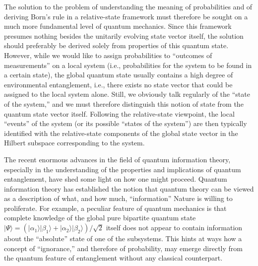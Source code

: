 \documentclass[twocolumn,aps,floatfix,amsmath,amssymb,showpacs,nofootinbib]{revtex4}
\newcommand{\ket}[1]{\ensuremath{|{#1\rangle}}}
\begin{document}
The solution to the problem of understanding the meaning of
probabilities and of deriving Born's rule in a relative-state
framework must therefore be sought on a much more fundamental level of
quantum mechanics. Since this framework presumes nothing besides the
unitarily evolving state vector itself, the solution should preferably
be derived solely from properties of this quantum state. However,
while we would like to assign probabilities to ``outcomes of
measurements'' on a local system (i.e., probabilities for the system
to be found in a certain state), the global quantum state usually
contains a high degree of environmental entanglement, i.e., there
exists no state vector that could be assigned to the local system
alone.  Still, we obviously talk regularly of the ``state of the
system,'' and we must therefore distinguish this notion of state from
the quantum state vector itself. Following the relative-state
viewpoint, the local ``events'' of the system (or its possible
``states of the system'') are then typically identified with the
relative-state components of the global state vector in the Hilbert
subspace corresponding to the system.

The recent enormous advances in the field of quantum information
theory, especially in the understanding of the properties and
implications of quantum entanglement, have shed some light on how one
might proceed. Quantum information theory has established the notion
that quantum theory can be viewed as a description of what, and how
much, ``information'' Nature is willing to proliferate. For example, a
peculiar feature of quantum mechanics is that complete knowledge of
the global pure bipartite quantum state $\ket{\Psi} = \left(
  \ket{\alpha_1}\ket{\beta_1} + \ket{\alpha_2}\ket{\beta_2}\right)
/\sqrt{2}$ itself does not appear to contain information about the
``absolute'' state of one of the subsystems.  This hints at ways how a
concept of ``ignorance,'' and therefore of probability, may emerge
directly from the quantum feature of entanglement without any
classical counterpart.
\end{document}
